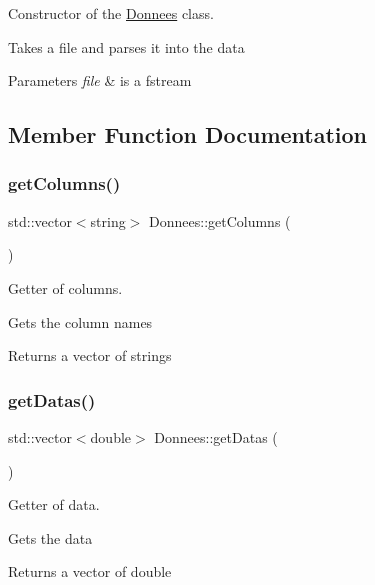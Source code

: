 Constructor of the \hyperlink{classDonnees}{Donnees} class. 

Takes a file and parses it into the data 
\begin{DoxyParams}{Parameters}
{\em file} & is a fstream \\
\hline
\end{DoxyParams}


\subsection{Member Function Documentation}
\hypertarget{classDonnees_a14bd2cef1e2356f8c9dfbb768ccd8da2}{}\label{classDonnees_a14bd2cef1e2356f8c9dfbb768ccd8da2} 
\subsubsection{\texorpdfstring{get\+Columns()}{getColumns()}}
{\footnotesize\ttfamily std\+::vector$<$string$>$ Donnees\+::get\+Columns (\begin{DoxyParamCaption}{ }\end{DoxyParamCaption})}



Getter of columns. 

Gets the column names \begin{DoxyReturn}{Returns}
a vector of strings 
\end{DoxyReturn}
\hypertarget{classDonnees_a99d5a923035f15d8fbd8c8a519cf5848}{}\label{classDonnees_a99d5a923035f15d8fbd8c8a519cf5848} 
\subsubsection{\texorpdfstring{get\+Datas()}{getDatas()}}
{\footnotesize\ttfamily std\+::vector$<$double$>$ Donnees\+::get\+Datas (\begin{DoxyParamCaption}{ }\end{DoxyParamCaption})}



Getter of data. 

Gets the data \begin{DoxyReturn}{Returns}
a vector of double 
\end{DoxyReturn}
\hypertarget{classDonnees_a90424f557bd469396ea30c13ed08730e}{}\label{classDonnees_a90424f557bd469396ea30c13ed08730e} 
